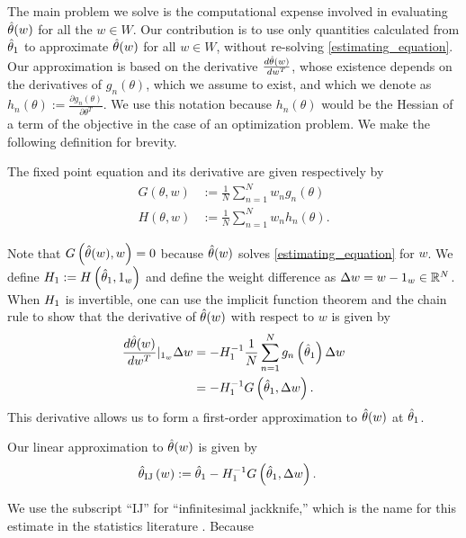 
The main problem we solve is the computational expense involved in evaluating
$\hat{\theta}(w)$ for all the $w\in W$. Our contribution is to use only quantities
calculated from $\hat{\theta}_{1}$ to approximate $\hat{\theta}(w)$ for all $w\in W$, without
re-solving \eqref{estimating_equation}. Our approximation is based on the
derivative $\frac{d\hat{\theta}(w)}{dw^{T}}$, whose existence depends on the
derivatives of $g_{n}\left(\theta\right)$, which we assume to exist, and which
we denote as $h_{n}\left(\theta\right):=\frac{\partial
g_{n}\left(\theta\right)}{\partial\theta^{T}}$. We use this notation because
$h_{n}\left(\theta\right)$ would be the Hessian of a term of the objective in
the case of an optimization problem. We make the following definition for
brevity.
%
\begin{defn}
The fixed point equation and its derivative are given respectively by
%
\begin{align*}
G\left(\theta,w\right) &:=
    \frac{1}{N}\sum_{n=1}^{N}w_{n}g_{n}\left(\theta\right) \\
H\left(\theta,w\right) &:=
    \frac{1}{N}\sum_{n=1}^{N}w_{n}h_{n}\left(\theta\right).
\end{align*}
%
\end{defn}
%
Note that $G\left(\hat{\theta}(w),w\right)=0$ because $\hat{\theta}(w)$ solves
\eqref{estimating_equation} for $w$. We define
$H_{1}:=H\left(\hat{\theta}_{1},1_{w}\right)$ and define the weight difference as
$\Delta w=w-1_{w}\in\mathbb{R}^{N}$. When $H_{1}$ is invertible, one can use the
implicit function theorem and the chain rule to show that the derivative of
$\hat{\theta}(w)$ with respect to $w$ is given by
%
\begin{align*}
\frac{d\hat{\theta}(w)}{dw^{T}}\rvert_{1_{w}}\Delta w & =
    -H_{1}^{-1}\frac{1}{N}\sum_{n=1}^{N}g_{n}
    \left(\hat{\theta}_{1}\right)\Delta w \\
    & =-H_{1}^{-1}G\left(\hat{\theta}_{1},\Delta w\right).
\end{align*}
%
This derivative allows us to form a first-order approximation to $\hat{\theta}(w)$
at $\hat{\theta}_{1}$.
%
\begin{defn}
\label{defref:ij_definition}Our linear approximation to $\hat{\theta}(w)$
is given by
%
\begin{align*}
\hat{\theta}_{\textrm{IJ}}\left(w\right) & :=\hat{\theta}_{1}-H_{1}^{-1}G\left(\hat{\theta}_{1},\Delta w\right).
\end{align*}
\end{defn}
%
We use the subscript ``IJ'' for ``infinitesimal jackknife,'' which is the name
for this estimate in the statistics literature
\citep{jaeckel:1972:infinitesimal,shao:1993:jackknifemestimator}. Because
